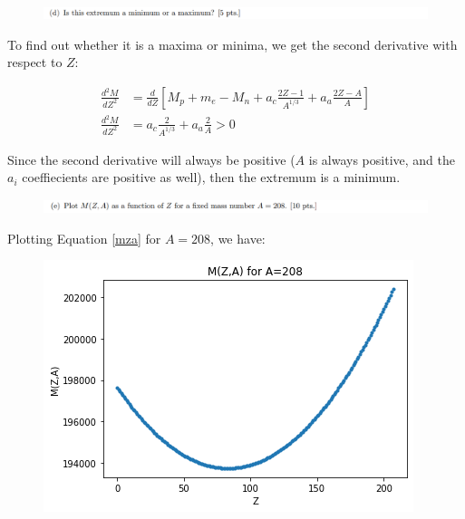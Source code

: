 \documentclass[11pt]{article}
\theoremstyle{definition}
\begin{document}
\begin{figure}[H]
    \centering
    \includegraphics[scale = 0.5]{1d.png}
\end{figure}

To find out whether it is a maxima or minima, we get the second derivative with respect to $Z$:

\begin{align}
    \frac{d^2M}{dZ^2} &=
    \frac{d}{dZ}
    \left[M_p + m_e -M_n 
    + a_c \frac{2Z-1}{A^{1/3}}
    + a_a \frac{2Z-A}{A}\right]\\
    \frac{d^2M}{dZ^2} &=
     a_c \frac{2}{A^{1/3}}
    + a_a \frac{2}{A}
    > 0
\end{align}

\begin{mdframed}
    Since the second derivative will always be positive ($A$ is always positive, and the $a_i$ coeffiecients are positive as well), then the extremum is a minimum.
\end{mdframed}
\newpage



\begin{figure}[H]
    \centering
    \includegraphics[scale = 0.5]{1e.png}
\end{figure}

Plotting Equation \ref{mza} for $A=208$, we have:


\begin{figure}[H]
    \centering
    \includegraphics[scale = 0.75]{M(Z,A).png}
\end{figure}
\newpage
\end{document}
